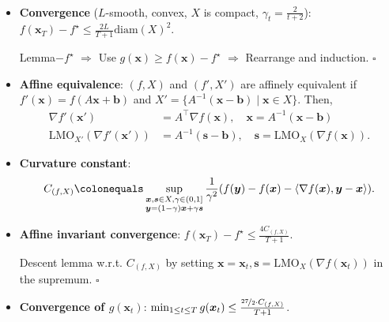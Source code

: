\documentclass[8pt,a4paper]{extarticle}
\renewcommand{\proof}[1]{\begin{tcolorbox}#1 \hfill $\square$\end{tcolorbox}}
\newcommand{\lft}{\mathopen{}\mathclose\bgroup\left}
\newcommand{\rgt}{\aftergroup\egroup\right}
\renewcommand{\vec}[1]{\bm{#1}}
\newcommand{\mat}[1]{#1}
\newenvironment{topic}[1]
{\textbf{\sffamily \colorbox{black}{\rlap{\textbf{\textcolor{white}{#1}}}\hspace{\linewidth}\hspace{-2\fboxsep}}} \\ \vspace{0.2cm}}
{}
\begin{document}
\begin{multicols*}{2}
\begin{topic}{Frank-Wolfe}
\begin{itemize}
            \item \textbf{Convergence} ($L$-smooth, convex, $X$ is compact, $\gamma_t = \frac{2}{t+2}$): \\ $f(\vec{x}_T) - f^\star \leq \frac{2L}{T+1} \mathrm{diam}(X)^2$.
                  \proof{Lemma$-f^\star$ $\Rightarrow$ Use $g(\vec{x}) \geq f(\vec{x}) - f^\star$ $\Rightarrow$ Rearrange and induction.}
            \item \textbf{Affine equivalence}: $(f, X)$ and $(f', X')$ are affinely equivalent if $f'(\vec{x}) = f(\mat{A} \vec{x} + \vec{b})$ and $X' = \{ \mat{A}^{-1}(\vec{x} - \vec{b}) \mid \vec{x} \in X \}$. Then,
                  \begin{align*}
                      \nabla f'(\vec{x}')                    & = \mat{A}^\top \nabla f(\vec{x}), \quad \vec{x} = \mat{A}^{-1} (\vec{x} - \vec{b})    \\
                      \mathrm{LMO}_{X'}(\nabla f'(\vec{x}')) & = \mat{A}^{-1}(\vec{s} - \vec{b}), \quad \vec{s} = \mathrm{LMO}_X(\nabla f(\vec{x})).
                  \end{align*}
            \item \textbf{Curvature constant}: \[
                      C_{(f,X)} \colonequals \sup_{\substack{\vec{x}, \vec{s}\in X, \gamma \in (0,1] \\ \vec{y} = (1-\gamma)\vec{x} + \gamma \vec{s}}} \frac{1}{\gamma^2}\lft( f(\vec{y}) - f(\vec{x}) - \langle \nabla f(\vec{x}), \vec{y} - \vec{x} \rangle \rgt).
                  \]
            \item \textbf{Affine invariant convergence}: $f(\vec{x}_T) - f^\star \leq \frac{4 C_{(f,X)}}{T+1}$.
                  \proof{Descent lemma w.r.t. $C_{(f,X)}$ by setting $\vec{x} = \vec{x}_t, \vec{s} = \mathrm{LMO}_X(\nabla f(\vec{x}_t))$ in the supremum.}
            \item \textbf{Convergence of $g(\vec{x}_t)$}: $\min_{1 \leq t \leq T} g(\vec{x}_t) \leq \frac{\nicefrac{27}{2} \cdot C_{(f, X)}}{T+1}$.
        \end{itemize}
    \end{topic}


\end{multicols*}
\end{document}
